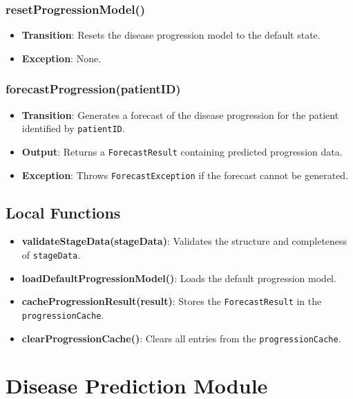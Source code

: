 \documentclass[12pt, titlepage]{article}
\begin{document}
\subsubsection{resetProgressionModel()}
\begin{itemize}
    \item \textbf{Transition}: Resets the disease progression model to the default state.
    \item \textbf{Exception}: None.
\end{itemize}

\subsubsection{forecastProgression(patientID)}
\begin{itemize}
    \item \textbf{Transition}: Generates a forecast of the disease progression for the patient identified by \texttt{patientID}.
    \item \textbf{Output}: Returns a \texttt{ForecastResult} containing predicted progression data.
    \item \textbf{Exception}: Throws \texttt{ForecastException} if the forecast cannot be generated.
\end{itemize}

\subsection{Local Functions}
\begin{itemize}
    \item \textbf{validateStageData(stageData)}: Validates the structure and completeness of \texttt{stageData}.
    \item \textbf{loadDefaultProgressionModel()}: Loads the default progression model.
    \item \textbf{cacheProgressionResult(result)}: Stores the \texttt{ForecastResult} in the \texttt{progressionCache}.
    \item \textbf{clearProgressionCache()}: Clears all entries from the \texttt{progressionCache}.
\end{itemize}

\section{Disease Prediction Module}
\label{Disease Prediction Module}
\end{document}

